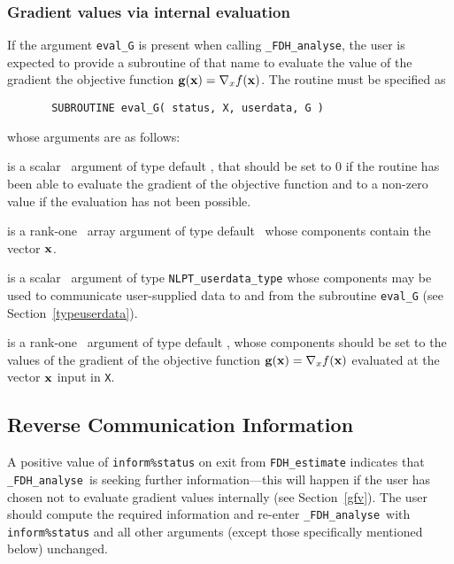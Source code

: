 \documentclass{galahad}
\newcommand{\packagename}{FDH}
\newcommand{\fullpackagename}{\libraryname\_\packagename}
\newcommand{\solver}{{\tt \fullpackagename\_analyse}}
\begin{document}

\subsubsection{Gradient values via internal evaluation\label{gfv}}

If the argument {\tt eval\_G} is present when calling \solver, the
user is expected to provide a subroutine of that name to evaluate the
value of the gradient the objective function ${\mathbf{g}}({\mathbf{x}}) = \nabla_x f({\mathbf{x}})$.
The routine must be specified as

\def\baselinestretch{0.8}
{\tt \begin{verbatim}
       SUBROUTINE eval_G( status, X, userdata, G )
\end{verbatim} }
\def\baselinestretch{1.0}
\noindent whose arguments are as follows:

\begin{description}
 is a scalar \intentout\ argument of type default \integer,
that should be set to 0 if the routine has been able to evaluate
the gradient of the objective function
and to a non-zero value if the evaluation has not been possible.

 is a rank-one \intentin\ array argument of type default \realdp\
whose components contain the vector ${\mathbf{x}}$.

 is a scalar \intentinout\ argument of type 
{\tt NLPT\_userdata\_type} whose components may be used
to communicate user-supplied data to and from the subroutine {\tt eval\_G}
(see Section~\ref{typeuserdata}). 

 is a rank-one \intentout\ argument of type default \realdp,
whose components should be set to the values of the gradient 
of the objective function ${\mathbf{g}}({\mathbf{x}}) = \nabla_x f({\mathbf{x}})$
evaluated at the vector ${\mathbf{x}}$ input in {\tt X}.

\end{description}


\subsection{\label{reverse}Reverse Communication Information}

A positive value of {\tt inform\%status} on exit from 
{\tt \packagename\_estimate}
indicates that
\solver\ is seeking further information---this will happen 
if the user has chosen not to evaluate gradient
values internally (see Section~\ref{gfv}).
The user should compute the required information and re-enter \solver\
with {\tt inform\%status} and all other arguments (except those specifically
mentioned below) unchanged.
\end{document}
